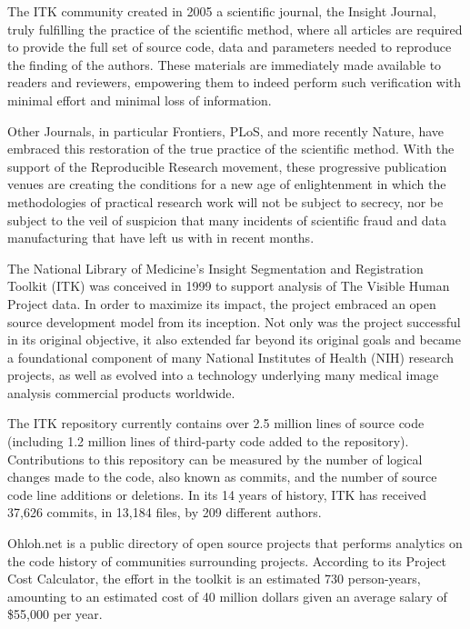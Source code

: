 \documentclass{frontiersENG} %
\begin{document}
The ITK community created in 2005 a scientific journal, the Insight Journal,
truly fulfilling the practice of the scientific method, where all articles are
required to provide the full set of source code, data and parameters needed to
reproduce the finding of the authors. These materials are immediately made
available to readers and reviewers, empowering them to indeed perform such
verification with minimal effort and minimal loss of information.

Other Journals, in particular Frontiers, PLoS, and more recently Nature, have
embraced this restoration of the true practice of the scientific method.  With
the support of the Reproducible Research movement, these progressive
publication venues are creating the conditions for a new age of enlightenment
in which the methodologies of practical research work will not be subject to
secrecy, nor be subject to the veil of suspicion that many incidents of
scientific fraud and data manufacturing that have left us with in recent
months.


The National Library of Medicine’s Insight Segmentation and Registration
Toolkit (ITK) was conceived in 1999 to support analysis of The Visible Human
Project data. In order to maximize its impact, the project embraced an open
source development model from its inception. Not only was the project
successful in its original objective, it also extended far beyond its original
goals and became a foundational component of many National Institutes of Health
(NIH) research projects, as well as evolved into a technology underlying many
medical image analysis commercial products worldwide.

%
%
The ITK repository currently contains over 2.5 million lines of source code
(including 1.2 million lines of third-party code added to the repository).
Contributions to this repository can be measured by the number of logical
changes made to the code, also known as commits, and the number of source code
line additions or deletions. In its 14 years of history, ITK has received
37,626 commits, in 13,184 files, by 209 different authors.

Ohloh.net \cite{OhlohITK2013} is a public directory of open source projects
that performs analytics on the code history of communities surrounding
projects. According to its Project Cost Calculator, the effort in the toolkit
is an estimated 730 person-years, amounting to an estimated cost of 40 million
dollars given an average salary of \$55,000 per year.
\end{document}
